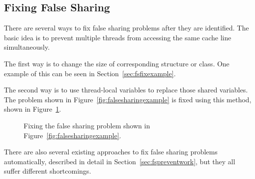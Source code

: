 \subsection{Fixing False Sharing}
There are several ways to fix false sharing problems after they are identified. The basic idea is to prevent multiple threads from accessing the same cache line simultaneously.  

The first way is to change the size of corresponding structure or class. One example of this can be seen in Section~\ref{sec:fsfixexample}.

The second way is to use thread-local variables to replace those shared variables. The problem shown in Figure~\ref{fig:falsesharingexample} is fixed using this method, shown in Figure~\ref{fig:falsesharingexamplefix}. 

\begin{figure}[!ht]
{\centering
\fbox{
\subfigure{}
}
\caption{Fixing the false sharing problem shown in Figure~\ref{fig:falsesharingexample}.
\label{fig:falsesharingexamplefix}}
}
\end{figure}

There are also several existing approaches to fix false sharing problems automatically, described in detail in Section~\ref{sec:fspreventwork}, but they all suffer different shortcomings. 




